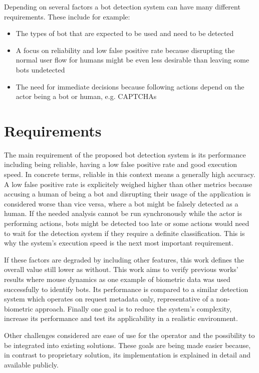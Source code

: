 \documentclass[
    fontsize=12pt,
    headings=small,
    parskip=half,           %
    bibliography=totoc,
    numbers=noenddot,       %
    open=any,               %
    final,                   %
    table
]{scrreprt}
\begin{document}
Depending on several factors a bot detection system can have many different requirements. These include for example:

\begin{itemize}
    \item The types of bot that are expected to be used and need to be detected
    \item A focus on reliability and low false positive rate because disrupting the normal user flow for humans might be even less desirable than leaving some bots undetected
    \item The need for immediate decisions because following actions depend on the actor being a bot or human, e.g. CAPTCHAs
\end{itemize}


\section{Requirements}

The main requirement of the proposed bot detection system is its performance including being reliable, having a low false positive rate and good execution speed. In concrete terms, reliable in this context means a generally high accuracy. A low false positive rate is explicitely weighed higher than other metrics because accusing a human of being a bot and disrupting their usage of the application is considered worse than vice versa, where a bot might be falsely detected as a human. If the needed analysis cannot be run synchronously while the actor is performing actions, bots might be detected too late or some actions would need to wait for the detection system if they require a definite classification. This is why the system's execution speed is the next most important requirement.

If these factors are degraded by including other features, this work defines the overall value still lower as without. This work aims to verify previous works' results where mouse dynamics as one example of biometric data was used successfully to identify bots. Its performance is compared to a similar detection system which operates on request metadata only, representative of a non-biometric approach. Finally one goal is to reduce the system's complexity, increase its performance and test its applicability in a realistic environment.

Other challenges considered are ease of use for the operator and the possibility to be integrated into existing solutions. These goals are being made easier because, in contrast to proprietary solution, its implementation is explained in detail and available publicly.
\end{document}
